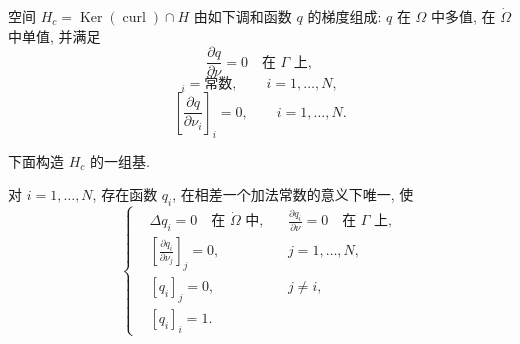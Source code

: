 \hypertarget{appendix-01-page-328}{}
\begin{Lemma}
\label{lem:app1-kernel-characterization}
空间 $H_c=\operatorname{Ker}(\operatorname{curl})\cap H$ 由如下调和函数 $q$ 的梯度组成: $q$ 在 $\Omega$ 中多值, 在 $\dot\Omega$ 中单值, 并满足
\begin{equation}
\frac{\partial q}{\partial\nu}=0\quad\text{在 }\Gamma\text{ 上},
\label{eq:app1-kernel-boundary-normal}
\end{equation}
\begin{equation}
[q]_i=\text{常数},
\qquad i=1,\ldots,N,
\label{eq:app1-kernel-jumps}
\end{equation}
\begin{equation}
\left[\frac{\partial q}{\partial\nu_i}\right]_i=0,
\qquad i=1,\ldots,N.
\label{eq:app1-kernel-normal-jumps}
\end{equation}
\end{Lemma}

下面构造 $H_c$ 的一组基.

\begin{Lemma}
\label{lem:app1-cut-potential-basis}
对 $i=1,\ldots,N$, 存在函数 $q_i$, 在相差一个加法常数的意义下唯一, 使
\begin{equation}
\left\{
\begin{aligned}
&\Delta q_i=0\quad\text{在 }\dot\Omega\text{ 中},
&&\frac{\partial q_i}{\partial\nu}=0\quad\text{在 }\Gamma\text{ 上},\\
&\left[\frac{\partial q_i}{\partial\nu_j}\right]_j=0,
&&j=1,\ldots,N,\\
&[q_i]_j=0,
&&j\neq i,\\
&[q_i]_i=1.
\end{aligned}
\right.
\label{eq:app1-normalized-cut-potential}
\end{equation}
\end{Lemma}

